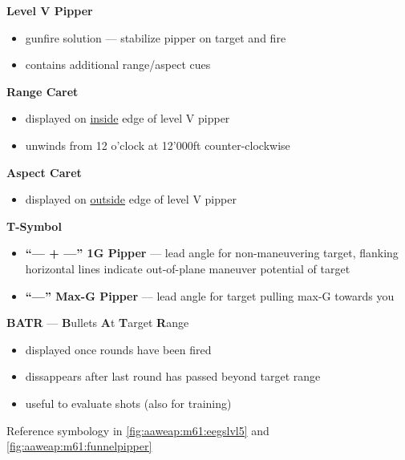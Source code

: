 \begin{tcoloritemize}
{    \begin{subitemize}
        \item \textbf{Level V Pipper}
        \begin{itemize}
            \item gunfire solution --- stabilize pipper on target and fire
            \item contains additional range/aspect cues
        \end{itemize}
        \item \textbf{Range Caret}
        \begin{itemize}
            \item displayed on \underline{inside} edge of level V pipper
            \item unwinds from 12 o'clock at 12'000ft counter-clockwise
        \end{itemize}
        \item \textbf{Aspect Caret} 
        \begin{itemize}
            \item displayed on \underline{outside} edge of level V pipper
        \end{itemize}
        \item \textbf{T-Symbol}
        \begin{itemize}
            \item \textbf{``--- + ---'' 1G Pipper} --- lead angle for non-maneuvering target,
            flanking horizontal lines indicate out-of-plane maneuver potential of target
            \item \textbf{``---'' Max-G Pipper} --- lead angle for target pulling max-G towards you
        \end{itemize}
        \item \textbf{BATR} --- \textbf{B}ullets \textbf{A}t \textbf{T}arget \textbf{R}ange
        \begin{itemize}
            \item displayed once rounds have been fired
            \item dissappears after last round has passed beyond target range
            \item useful to evaluate shots (also for training)
        \end{itemize}
    \end{subitemize}
    
    Reference symbology in \cref{fig:aaweap:m61:eegslvl5} and \cref{fig:aaweap:m61:funnelpipper}
    }
\end{tcoloritemize}

